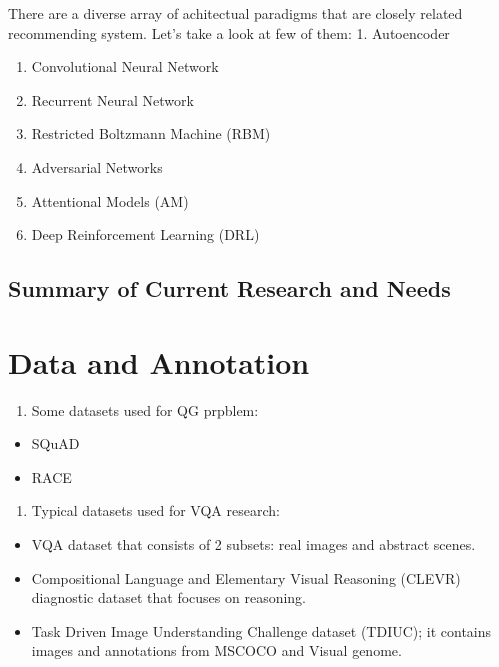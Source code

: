 \documentclass[]{book}
\providecommand{\tightlist}{%
  \setlength{\itemsep}{0pt}\setlength{\parskip}{0pt}}
\theoremstyle{definition}
\theoremstyle{definition}
\theoremstyle{definition}
\theoremstyle{remark}
\begin{document}
There are a diverse array of achitectual paradigms that are closely
related recommending system. Let's take a look at few of them: 1.
Autoencoder

\begin{enumerate}
\def\labelenumi{\arabic{enumi}.}
\setcounter{enumi}{1}
\item
  Convolutional Neural Network
\item
  Recurrent Neural Network
\item
  Restricted Boltzmann Machine (RBM)
\item
  Adversarial Networks
\item
  Attentional Models (AM)
\item
  Deep Reinforcement Learning (DRL)
\end{enumerate}

\subsection{Summary of Current Research and
Needs}\label{summary-of-current-research-and-needs}

\section{Data and Annotation}\label{data-and-annotation}

\begin{enumerate}
\def\labelenumi{\arabic{enumi}.}
\tightlist
\item
  Some datasets used for QG prpblem:
\end{enumerate}

\begin{itemize}
\item
  SQuAD
\item
  RACE
\end{itemize}

\begin{enumerate}
\def\labelenumi{\arabic{enumi}.}
\setcounter{enumi}{1}
\tightlist
\item
  Typical datasets used for VQA research:
\end{enumerate}

\begin{itemize}
\item
  VQA dataset that consists of 2 subsets: real images and abstract
  scenes.
\item
  Compositional Language and Elementary Visual Reasoning (CLEVR)
  diagnostic dataset that focuses on reasoning.
\item
  Task Driven Image Understanding Challenge dataset (TDIUC); it contains
  images and annotations from MSCOCO and Visual genome.
\end{itemize}
\end{document}
